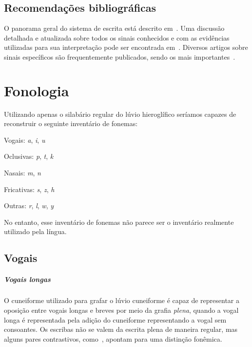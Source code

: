 \section{Recomendações bibliográficas}

O panorama geral do sistema de escrita está descrito
em~\citet[p. 155ff.]{HawkinsScripts}.
Uma discussão detalhada e atualizada sobre todos os sinais conhecidos e com
as evidências utilizadas para sua interpretação pode ser encontrada
em~\citet[354--488]{CHLI3}.
Diversos artigos sobre sinais específicos são frequentemente publicados, sendo
os mais
importantes~\citet{HawkinsMorpurgoNeumann1974,Rieken2008,RiekenYakubovich2010}.

\chapter{Fonologia}

Utilizando apenas o silabário regular do lúvio hieroglífico seríamos capazes de
reconstruir o seguinte inventário de fonemas:

\begin{compactitem}
	\item Vogais: \emph{a}, \emph{i}, \emph{u}
	\item Oclusivas: \emph{p}, \emph{t}, \emph{k}
	\item Nasais: \emph{m}, \emph{n}
	\item Fricativas: \emph{s}, \emph{z}, \emph{h}
	\item Outras: \emph{r}, \emph{l}, \emph{w}, \emph{y}
\end{compactitem}
No entanto, esse inventário de fonemas não parece ser o inventário realmente
utilizado pela língua.

\section{Vogais}

\paragraph{Vogais longas}
O cuneiforme utilizado para grafar o lúvio cuneiforme é capaz de representar
a oposição entre vogais longas e
breves por meio da grafia \emph{plena}, quando a vogal longa é representada pela
adição do cuneiforme representando a vogal sem consoantes.
Os escribas não se valem da escrita plena de maneira regular, mas alguns pares
contrastivos, como~\Next, apontam para uma distinção fonêmica.

